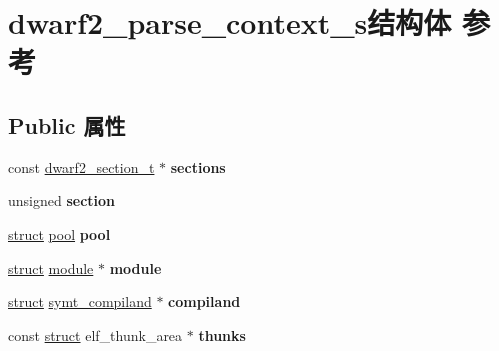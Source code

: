 \hypertarget{structdwarf2__parse__context__s}{}\section{dwarf2\+\_\+parse\+\_\+context\+\_\+s结构体 参考}
\label{structdwarf2__parse__context__s}
\subsection*{Public 属性}
\begin{DoxyCompactItemize}
\item 
\mbox{\label{structdwarf2__parse__context__s_a1855941037153add6b0c3caaab8535e8}} 
const \hyperlink{structdwarf2__section__s}{dwarf2\+\_\+section\+\_\+t} $\ast$ {\bfseries sections}
\item 
\mbox{\label{structdwarf2__parse__context__s_a7dcc88de25646e1c071c3b4e1df79345}} 
unsigned {\bfseries section}
\item 
\mbox{\label{structdwarf2__parse__context__s_ac4a163dcca20b87de15a8c0b58ee9fea}} 
\hyperlink{interfacestruct}{struct} \hyperlink{structpool}{pool} {\bfseries pool}
\item 
\mbox{\label{structdwarf2__parse__context__s_ae8b38be9e628074f5ae923080c6978a6}} 
\hyperlink{interfacestruct}{struct} \hyperlink{structmodule}{module} $\ast$ {\bfseries module}
\item 
\mbox{\label{structdwarf2__parse__context__s_a92bc1b84cef58d28a1defaa50a582bd6}} 
\hyperlink{interfacestruct}{struct} \hyperlink{structsymt__compiland}{symt\+\_\+compiland} $\ast$ {\bfseries compiland}
\item 
\mbox{\label{structdwarf2__parse__context__s_a5b81b061b082725a277da13464df1f9e}} 
const \hyperlink{interfacestruct}{struct} elf\+\_\+thunk\+\_\+area $\ast$ {\bfseries thunks}
\item 
\mbox{\label{structdwarf2__parse__context__s_aae4013c45ad1381678ef3c26c4432056}} 

\end{DoxyCompactItemize}
